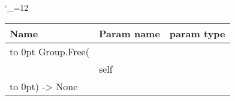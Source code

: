 \begingroup \catcode`\_=12 \tt
\begin{tabular}{lll}
\toprule
\textrm{Name}&\textrm{Param name}&\textrm{param type}\\
\midrule
\hbox to 0pt {Group.Free(\hss}\\
& self\\
\hbox to 0pt{) -> None\hss}\\
\bottomrule
\end{tabular}
\endgroup
